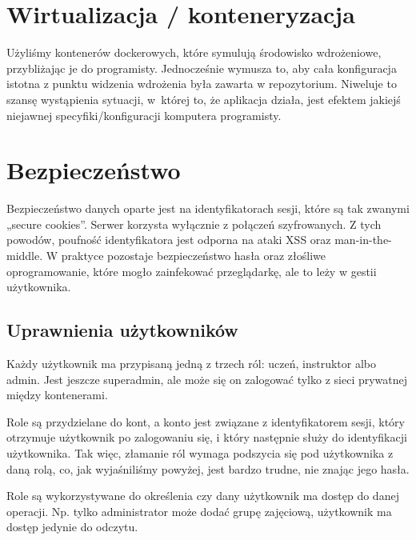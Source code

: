 \documentclass{article}
\begin{document}
\section{Wirtualizacja / konteneryzacja}
Użyliśmy kontenerów dockerowych, które symulują środowisko wdrożeniowe, przybliżając
je do programisty. Jednocześnie wymusza to, aby cała konfiguracja istotna z punktu
widzenia wdrożenia była zawarta w repozytorium. Niweluje to szansę wystąpienia
sytuacji, w~której to, że aplikacja działa, jest efektem jakiejś niejawnej
specyfiki/konfiguracji komputera programisty.

\section{Bezpieczeństwo}
Bezpieczeństwo danych oparte jest na identyfikatorach sesji, które są
tak zwanymi „secure cookies”. Serwer korzysta wyłącznie z połączeń szyfrowanych.
Z tych powodów, poufność identyfikatora jest odporna na ataki XSS
oraz man-in-the-middle. W praktyce pozostaje bezpieczeństwo hasła oraz
złośliwe oprogramowanie, które mogło zainfekować przeglądarkę, ale to
leży w gestii użytkownika.

\subsection{Uprawnienia użytkowników}
Każdy użytkownik ma przypisaną jedną z trzech ról: uczeń, instruktor albo admin.
Jest jeszcze superadmin, ale może się on zalogować tylko z sieci prywatnej między
kontenerami.

Role są przydzielane do kont, a konto jest związane z identyfikatorem sesji, który
otrzymuje użytkownik po zalogowaniu się, i który następnie służy do identyfikacji
użytkownika. Tak więc, złamanie ról wymaga podszycia się pod użytkownika z daną
rolą, co, jak wyjaśniliśmy powyżej, jest bardzo trudne, nie znając jego hasła.

Role są wykorzystywane do określenia czy dany użytkownik ma dostęp do danej operacji.
Np. tylko administrator może dodać grupę zajęciową, użytkownik ma dostęp jedynie
do odczytu.
\end{document}

